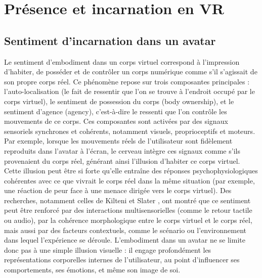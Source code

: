 \section{Présence et incarnation en VR}


\subsection{Sentiment d'incarnation dans un avatar}
Le sentiment d’embodiment dans un corps virtuel correspond à l’impression d’habiter, de posséder et de 
contrôler un corps numérique comme s’il s’agissait de son propre corps réel. Ce phénomène repose sur 
trois composantes principales : l’auto-localisation (le fait de ressentir que l’on se trouve à l’endroit 
occupé par le corps virtuel), le sentiment de possession du corps (body ownership), et le sentiment d’agence
 (agency), c’est-à-dire le ressenti que l’on contrôle les mouvements de ce corps. Ces composantes sont 
 activées par des signaux sensoriels synchrones et cohérents, notamment visuels, proprioceptifs et moteurs.
  Par exemple, lorsque les mouvements réels de l’utilisateur sont fidèlement reproduits dans l’avatar à l’écran,
le cerveau intègre ces signaux comme s’ils provenaient du corps réel, générant ainsi l’illusion d’habiter
ce corps virtuel. Cette illusion peut être si forte qu’elle entraîne des réponses psychophysiologiques 
cohérentes avec ce que vivrait le corps réel dans la même situation (par exemple, une réaction de peur
    face à une menace dirigée vers le corps virtuel). Des recherches, notamment celles de Kilteni et Slater \cite{Kilteni2012Embodiment}, 
    ont montré que ce sentiment peut être renforcé par des interactions multisensorielles (comme le retour
tactile ou audio), par la cohérence morphologique entre le corps virtuel et le corps réel, mais aussi 
      par des facteurs contextuels, comme le scénario ou l'environnement dans lequel l'expérience se déroule.
       L’embodiment dans un avatar ne se limite donc pas à une simple illusion visuelle : il engage profondément 
       les représentations corporelles internes de l’utilisateur, au point d’influencer ses comportements, 
       ses émotions, et même son image de soi.


